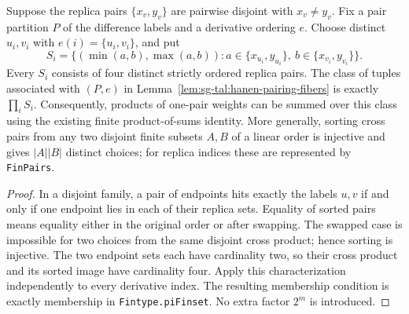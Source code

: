 \begin{lemma}\label{lem:sg-tal:hanen-endpoint-choice-sets}
\leanok
{}
Suppose the replica pairs $\{x_v,y_v\}$ are pairwise disjoint with $x_v\ne y_v$.
Fix a pair partition $P$ of the difference labels and a derivative ordering $e$.
Choose distinct $u_i,v_i$ with $e(i)=\{u_i,v_i\}$, and put
\[
 S_i=\{(\min(a,b),\max(a,b)):
        a\in\{x_{u_i},y_{u_i}\},\ b\in\{x_{v_i},y_{v_i}\}\}.
\]
Every $S_i$ consists of four distinct strictly ordered replica pairs. The class
of tuples associated with $(P,e)$ in
Lemma~\ref{lem:sg-tal:hanen-pairing-fibers} is exactly $\prod_i S_i$.
Consequently, products of one-pair weights can be summed over this class using
the existing finite product-of-sums identity.
More generally, sorting cross pairs from any two disjoint finite subsets $A,B$
of a linear order is injective and gives $|A||B|$ distinct choices; for replica
indices these are represented by \texttt{FinPairs}.
\end{lemma}
\begin{proof}
\leanok
In a disjoint family, a pair of endpoints hits exactly the labels $u,v$ if and
only if one endpoint lies in each of their replica sets. Equality of sorted
pairs means equality either in the original order or after swapping. The swapped
case is impossible for two choices from the same disjoint cross product; hence
sorting is injective. The two endpoint sets each have cardinality two, so their
cross product and its sorted image have cardinality four. Apply this characterization
independently to every derivative index. The resulting membership condition is
exactly membership in \texttt{Fintype.piFinset}. No extra factor $2^m$ is introduced.
\end{proof}

